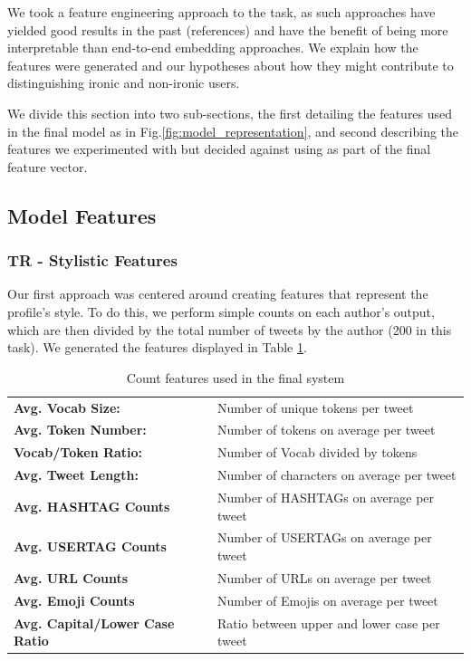  We took a feature engineering approach to the task, as such approaches have yielded good results in the past (references) and have the benefit of being more interpretable than end-to-end embedding approaches. We explain how the features were generated and our hypotheses about how they might contribute to distinguishing ironic and non-ironic users. 
 
 We divide this section into two sub-sections, the first detailing the features used in the final model as in Fig.\ref{fig:model_representation}, and second describing the features we experimented with but decided against using as part of the final feature vector.
 
 \subsection{Model Features}
    \subsubsection{TR - Stylistic Features}
        Our first approach was centered around creating features that represent the profile's style. To do this, we perform simple counts on each author's output, which are then divided by the total number of tweets by the author (200 in this task). We generated the features displayed in Table \ref{tab:count-features}.
        \begin{table}
            \centering
            \begin{tabular}{ l l } 
             \textbf{Avg. Vocab Size:} & Number of unique tokens per tweet \\
             \textbf{Avg. Token Number:}  & Number of tokens on average per tweet \\
             \textbf{Vocab/Token Ratio:}  & Number of Vocab divided by tokens\\
             \textbf{Avg. Tweet Length:} & Number of characters on average per tweet\\
             \textbf{Avg. HASHTAG Counts} & Number of HASHTAGs on average per tweet\\
             \textbf{Avg. USERTAG Counts} & Number of USERTAGs on average per tweet\\
             \textbf{Avg. URL Counts } & Number of URLs on average per tweet \\
             \textbf{Avg. Emoji Counts } & Number of Emojis on average per tweet\\
             \textbf{Avg. Capital/Lower Case Ratio} & Ratio between upper and lower case per tweet\\
            \end{tabular}
            \caption{Count features used in the final system}
            \label{tab:count-features}
        \end{table}
        
